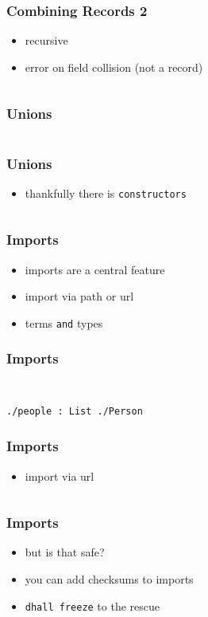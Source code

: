 \documentclass{beamer}
\begin{document}
\begin{frame}[fragile]
  \frametitle{Combining Records 2}
  \begin{itemize}
  \item recursive
  \item error on field collision (not a record)
  \end{itemize}
  \inputminted{text}{static-source/records-combine2.out}
\end{frame}

\begin{frame}
  \frametitle{Unions}
  \inputminted{text}{static-source/unions.out}
\end{frame}

 \begin{frame}
  \frametitle{Unions}
  \begin{itemize}
  \item thankfully there is \texttt{constructors}
  \end{itemize}
  \inputminted{text}{dhall/constructors.dhall}
\end{frame}

\begin{frame}
  \frametitle{Imports}
  \begin{itemize}
  \item imports are a central feature
  \item import via path or url
  \item terms \texttt{and} types
  \end{itemize}
\end{frame}

\begin{frame}[fragile]
  \frametitle{Imports}
  \inputminted{text}{dhall/persons/people}
  \inputminted{text}{dhall/persons/Person}
  \begin{verbatim}
./people : List ./Person
  \end{verbatim}
\end{frame}

\begin{frame}
  \frametitle{Imports}
  \begin{itemize}
  \item import via url
  \end{itemize}
  \inputminted{text}{dhall/persons/UrlImport.dhall}
\end{frame}

\begin{frame}
  \frametitle{Imports}
  \begin{itemize}
  \item but is that safe?
  \item you can add checksums to imports
  \item \texttt{dhall freeze} to the rescue
  \end{itemize}
  \inputminted[fontsize=\scriptsize]{text}{dhall/persons/UrlImportFrozen.dhall}
\end{frame}
\end{document}
